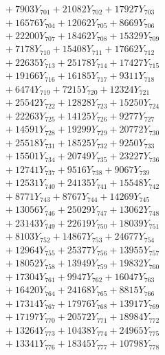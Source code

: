 \documentclass[a4paper,10pt]{article}
\begin{document}
{\begin{align}
&\;  + 7903 Y_{701} + 21082 Y_{702} + 17927 Y_{703} \\[0.3ex]
&\;  + 16576 Y_{704} + 12062 Y_{705} + 8669 Y_{706} \\[0.3ex]
&\;  + 22200 Y_{707} + 18462 Y_{708} + 15329 Y_{709} \\[0.3ex]
&\;  + 7178 Y_{710} + 15408 Y_{711} + 17662 Y_{712} \\[0.3ex]
&\;  + 22635 Y_{713} + 25178 Y_{714} + 17427 Y_{715} \\[0.3ex]
&\;  + 19166 Y_{716} + 16185 Y_{717} + 9311 Y_{718} \\[0.5ex]\allowbreak
&\;  + 6474 Y_{719} + 7215 Y_{720} + 12324 Y_{721} \\[0.3ex]
&\;  + 25542 Y_{722} + 12828 Y_{723} + 15250 Y_{724} \\[0.3ex]
&\;  + 22263 Y_{725} + 14125 Y_{726} + 9277 Y_{727} \\[0.3ex]
&\;  + 14591 Y_{728} + 19299 Y_{729} + 20772 Y_{730} \\[0.3ex]
&\;  + 25518 Y_{731} + 18525 Y_{732} + 9250 Y_{733} \\[0.3ex]
&\;  + 15501 Y_{734} + 20749 Y_{735} + 23227 Y_{736} \\[0.3ex]
&\;  + 12741 Y_{737} + 9516 Y_{738} + 9067 Y_{739} \\[0.3ex]
&\;  + 12531 Y_{740} + 24135 Y_{741} + 15548 Y_{742} \\[0.3ex]
&\;  + 8771 Y_{743} + 8767 Y_{744} + 14269 Y_{745} \\[0.3ex]
&\;  + 13056 Y_{746} + 25029 Y_{747} + 13062 Y_{748} \\[0.5ex]\allowbreak
&\;  + 23143 Y_{749} + 22619 Y_{750} + 18039 Y_{751} \\[0.3ex]
&\;  + 8103 Y_{752} + 14867 Y_{753} + 24677 Y_{754} \\[0.3ex]
&\;  + 12964 Y_{755} + 25377 Y_{756} + 13955 Y_{757} \\[0.3ex]
&\;  + 18052 Y_{758} + 13949 Y_{759} + 19832 Y_{760} \\[0.3ex]
&\;  + 17304 Y_{761} + 9947 Y_{762} + 16047 Y_{763} \\[0.3ex]
&\;  + 16420 Y_{764} + 24168 Y_{765} + 8815 Y_{766} \\[0.3ex]
&\;  + 17314 Y_{767} + 17976 Y_{768} + 13917 Y_{769} \\[0.3ex]
&\;  + 17197 Y_{770} + 20572 Y_{771} + 18984 Y_{772} \\[0.3ex]
&\;  + 13264 Y_{773} + 10438 Y_{774} + 24965 Y_{775} \\[0.3ex]
&\;  + 13341 Y_{776} + 18345 Y_{777} + 10798 Y_{778} \\[0.5ex]\allowbreak

\end{align}}
\end{document}
